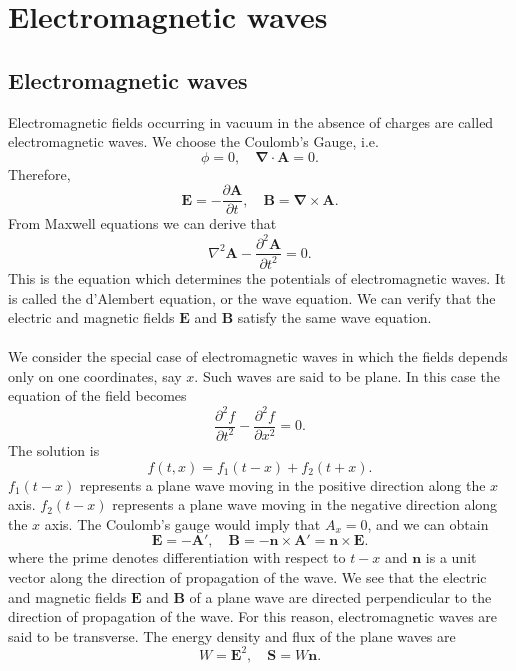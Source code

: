 \section{Electromagnetic waves}
\subsection{Electromagnetic waves}
Electromagnetic fields occurring in vacuum in the absence of  charges are called electromagnetic waves. We choose the Coulomb's Gauge, i.e.
\[ \phi = 0 , \quad \bm{\nabla} \cdot \bm{A} = 0.\]
Therefore,
\[\bm{E} = -\frac{\partial \bm{A}}{\partial t} , \quad \bm{B} = \bm{\nabla} \times \bm{A}.\]
From Maxwell equations we can derive that
\[\nabla^2 \bm{A} - \frac{\partial^2 \bm{A}}{\partial t^2} = 0.\]
This is the equation which determines the potentials of electromagnetic waves. It is called the d'Alembert equation, or the wave equation. We can verify that the electric and magnetic fields $\bm{E}$ and $\bm{B}$ satisfy the same wave equation.
\\ \\
We consider the special case of electromagnetic waves in which the fields depends only on one coordinates, say $x$. Such waves are said to be plane. In this case the equation of the field becomes
\[\frac{\partial^2 f}{\partial t^2}  - \frac{\partial^2 f}{\partial x^2} = 0.\]
The solution is
\[f(t,x) = f_1(t-x) + f_2(t+x).\]
$f_1(t-x)$ represents a plane wave moving in the positive direction along the $x$ axis. $f_2(t-x)$ represents a plane wave moving in the negative direction along the $x$ axis. The Coulomb's gauge would imply that $A_x = 0$, and we can obtain
\[\bm{E} = -\bm{A}' , \quad \bm{B} = -\bm{n} \times \bm{A}' = \bm{n} \times \bm{E}.\]
where the prime denotes differentiation with respect to $t-x$ and $\bm{n}$ is a unit vector along the direction of propagation of the wave. We see that the electric and magnetic fields $\bm{E}$ and $\bm{B}$ of a plane wave are directed perpendicular to the direction of propagation of the wave. For this reason, electromagnetic waves are said to be transverse.
The energy density and flux of the plane waves are
\[W = \bm{E}^2 , \quad \bm{S} = W\bm{n}.\]

